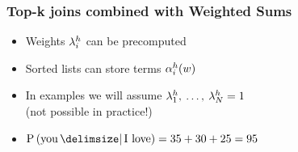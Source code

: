 \documentclass{presentation}
\begin{document}
\begin{frame}
  \frametitle{Top-k joins combined with Weighted Sums}

  \vspace{-0.2cm}

  \vspace{-0.5cm}
  \large
  \begin{itemize}
    \item<3-> Weights $\lambda^h_i$ can be precomputed
    \vspace{0.2cm}
    \item<4-> Sorted lists can store terms $\alpha_i^h(w)$
  \end{itemize}


  \large
  \begin{itemize}
    \item<5-> In examples we will assume $\lambda^h_1, \: \ldots, \: \lambda^h_N = 1$\\
      {\small(not possible in practice!)}
    \vspace{0.2cm}
    \item<6-> \alert<6>{$\Prob{\text{you}}{\text{I love}} = 35 + 30 + 25 = 95$}
  \end{itemize}
\end{frame}
\end{document}
